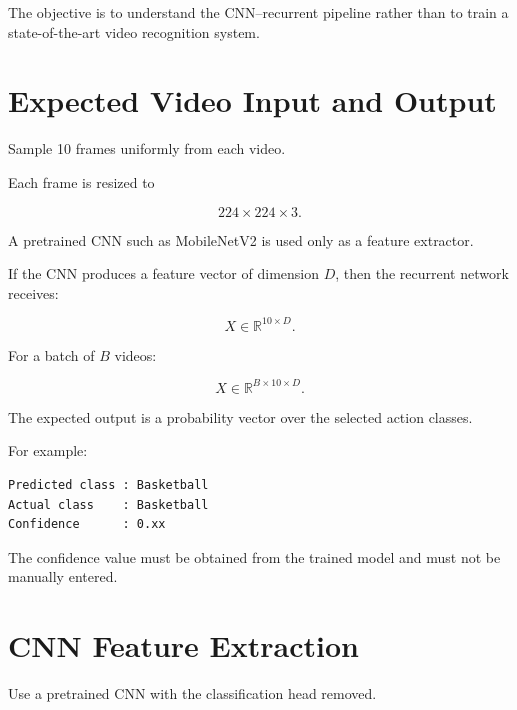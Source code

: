 \documentclass[10pt]{article}
\begin{document}
The objective is to understand the CNN--recurrent pipeline rather than to
train a state-of-the-art video recognition system.

\section{Expected Video Input and Output}

Sample 10 frames uniformly from each video.

Each frame is resized to

\[
224\times224\times3.
\]

A pretrained CNN such as MobileNetV2 is used only as a feature extractor.

If the CNN produces a feature vector of dimension $D$, then the recurrent
network receives:

\[
X\in\mathbb{R}^{10\times D}.
\]

For a batch of $B$ videos:

\[
X\in\mathbb{R}^{B\times10\times D}.
\]

The expected output is a probability vector over the selected action classes.

For example:

\begin{verbatim}
Predicted class : Basketball
Actual class    : Basketball
Confidence      : 0.xx
\end{verbatim}

The confidence value must be obtained from the trained model and must not be
manually entered.

\section{CNN Feature Extraction}

Use a pretrained CNN with the classification head removed.

\begin{center}
\end{center}
\end{document}
